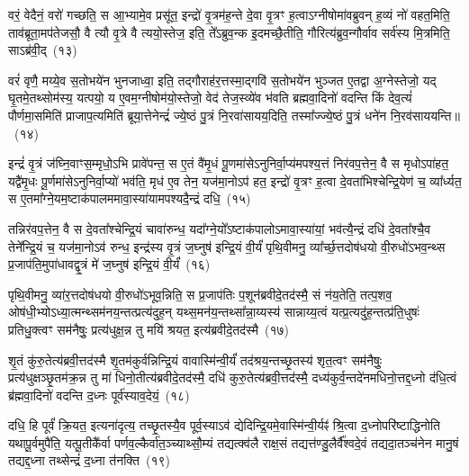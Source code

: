वरं॒ वेदैनं॒ वरो॑ गच्छति॒ स आ॒भ्यामे॒व प्रसू॑त॒ इन्द्रो॑ वृ॒त्रम॑ह॒न्ते दे॒वा वृ॒त्रꣳ ह॒त्वा\-ऽग्नी\-षोमा॑वब्रुवन् ह॒व्यं नो॑ वहत॒मिति॒ ताव॑ब्रूता॒मप॑तेजसौ॒ वै त्यौ वृ॒त्रे वै त्ययो॒स्तेज॒ इति॒ ते᳚\-ऽब्रुव॒न्क इ॒दमच्छै॒तीति॒ गौरित्य॑ब्रुव॒न्गौर्वाव सर्व॑स्य मि॒त्रमिति॒ सा\-ऽब्र॑वी॒द्~(१३)

वरं॑ वृणै॒ मय्ये॒व स॒तोभये॑न भुनजाध्वा॒ इति॒ तद्गौराह॑र॒त्तस्मा॒द्गवि॑ स॒तोभये॑न भुञ्जत ए॒तद्वा अ॒ग्नेस्तेजो॒ यद् घृ॒तमे॒तथ्सोम॑स्य॒ यत्पयो॒ य ए॒वम॒ग्नी\-षोम॑यो॒स्तेजो॒ वेद॑ तेज॒स्व्ये॑व भ॑वति ब्रह्मवा॒दिनो॑ वदन्ति किं देव॒त्यं॑ पौर्णमा॒समिति॑ प्राजाप॒त्यमिति॑ ब्रूया॒त्तेनेन्द्रं॑ ज्ये॒ष्ठं पु॒त्रं नि॒रवा॑सायय॒दिति॒ तस्मा᳚ज्ज्ये॒ष्ठं पु॒त्रं धने॑न नि॒रव॑साययन्ति॥~(१४)

{\anuvakamend[{अ॒स्य॒ मा वेदा द्यावा॑पृथि॒व्योर॑ब्रवी॒दिति॒ तस्मा᳚च्च॒त्वारि॑ च}]}%

इन्द्रं॑ वृ॒त्रं ज॑घ्नि॒वाꣳस॒म्मृधो॒\-ऽभि प्रावे॑पन्त॒ स ए॒तं वै॑मृ॒धं पू॒णमा॑से\-ऽनुनिर्वा॒प्य॑मपश्य॒त्तं निर॑वप॒त्तेन॒ वै स मृधो\-ऽपा॑हत॒ यद्वै॑मृ॒धः पू॒र्णमा॑से\-ऽनुनिर्वा॒प्यो॑ भव॑ति॒ मृध॑ ए॒व तेन॒ यज॑मा॒नो\-ऽप॑ हत॒ इन्द्रो॑ वृ॒त्रꣳ ह॒त्वा दे॒वता॑भिश्चेन्द्रि॒येण॑ च॒ व्या᳚र्ध्यत॒ स ए॒तमा᳚ग्ने॒यम॒ष्टाक॑पालममावा॒स्या॑यामपश्यदै॒न्द्रं दधि॒~(१५)

तन्निर॑वप॒त्तेन॒ वै स दे॒वता᳚श्चेन्द्रि॒यं चावा॑रुन्ध॒ यदा᳚ग्ने॒यो᳚\-ऽष्टाक॑पालो\-ऽमावा॒स्या॑यां॒ भव॑त्यै॒न्द्रं दधि॑ दे॒वता᳚श्चै॒व तेने᳚न्द्रि॒यं च॒ यज॑मा॒नो\-ऽव॑ रुन्ध॒ इन्द्र॑स्य वृ॒त्रं ज॒घ्नुष॑ इन्द्रि॒यं वी॒र्यं॑ पृथि॒वीमनु॒ व्या᳚र्च्छ॒त्तदोष॑धयो वी॒रुधो॑\-ऽभव॒न्थ्स प्र॒जा\-प॑ति॒मुपा॑धावद्वृ॒त्रं मे॑ ज॒घ्नुष॑ इन्द्रि॒यं वी॒र्यं॑~(१६)

पृथि॒वीमनु॒ व्या॑र॒त्तदोष॑धयो वी॒रुधो॑\-ऽभूव॒न्निति॒ स प्र॒जा\-प॑तिः प॒शून॑ब्रवीदे॒तद॑स्मै॒ सं न॑य॒तेति॒ तत्प॒शव॒ ओष॑धी॒भ्यो\-ऽध्या॒त्मन्थ्सम॑नय॒न्तत्प्रत्य॑दुह॒न् यथ्स॒मन॑य॒न्तथ्सा᳚न्ना॒य्यस्य॑ सान्नाय्य॒त्वं यत्प्र॒त्यदु॑ह॒न्तत्प्र॑ति॒धुषः॑ प्रतिधु॒क्त्वꣳ सम॑नैषुः॒ प्रत्य॑धुक्ष॒न्न तु मयि॑ श्रयत॒ इत्य॑ब्रवीदे॒तद॑स्मै~(१७)

शृ॒तं कु॑रु॒तेत्य॑ब्रवी॒त्तद॑स्मै शृ॒तम॑कुर्वन्निन्द्रि॒यं वावास्मि॑न्वी॒र्यं॑ तद॑श्रय॒न्तच्छृ॒तस्य॑ शृत॒त्वꣳ सम॑नैषुः॒ प्रत्य॑धुक्षञ्छृ॒तम॑क्र॒न्न तु मा॑ धिनो॒तीत्य॑ब्रवीदे॒तद॑स्मै॒ दधि॑ कुरु॒तेत्य॑ब्रवी॒त्तद॑स्मै॒ दध्य॑कुर्व॒न्तदे॑नमधिनो॒त्तद्द॒ध्नो द॑धि॒त्वं ब्र॑ह्मवा॒दिनो॑ वदन्ति द॒ध्नः पूर्व॑स्याव॒देयं॒~(१८)

दधि॒ हि पूर्वं॑ क्रि॒यत॒ इत्यना॑दृत्य॒ तच्छृ॒तस्यै॒व पूर्व॒स्याऽव॑ द्येदिन्द्रि॒यमे॒वास्मि॑न्वी॒र्यꣴ॑ श्रि॒त्वा द॒ध्नोपरि॑ष्टाद्धिनोति यथापू॒र्वमुपै॑ति॒ यत्पू॒तीकै᳚र्वा पर्णव॒ल्कैर्वा॑त॒ञ्च्याथ्सौ॒म्यं तद्यत्क्व॑लै राक्ष॒सं तद्यत्त॑ण्डु॒लैर्वै᳚श्वदे॒वं तद्यदा॒तञ्च॑नेन मानु॒षं तद्यद्द॒ध्ना तथ्सेन्द्रं॑ द॒ध्ना त॑नक्ति~(१९)

